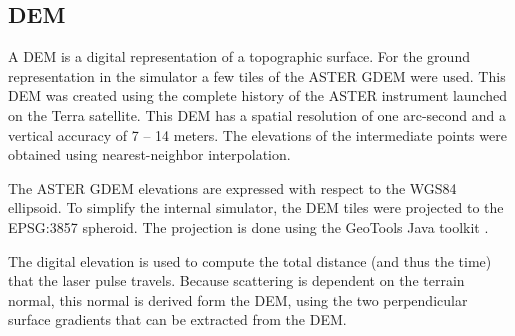 \subsection{\acl{DEM}}
\label{DEM}

A \acl{DEM} is a digital representation of a topographic surface. For the ground representation
in the simulator a few tiles of the \ac{ASTER} \ac{GDEM} were used. This \ac{DEM} was created using the
complete history of the \ac{ASTER} instrument launched on the Terra satellite. This \ac{DEM} has a
spatial resolution of one arc-second and a vertical accuracy of 7 -- 14 meters. The elevations of the
intermediate points were obtained using nearest-neighbor interpolation.

The \ac{ASTER} \ac{GDEM} elevations are expressed with respect to the \ac{WGS84} ellipsoid. To simplify the
internal simulator, the \ac{DEM} tiles were projected to the EPSG:3857 spheroid. The projection
is done using the GeoTools Java toolkit \cite{geotools}.

The digital elevation is used to compute the total distance (and thus the time) that the laser pulse
travels. Because scattering is dependent on the terrain normal, this normal is
derived form the \ac{DEM}, using the two perpendicular surface gradients that
can be extracted from the \ac{DEM}.